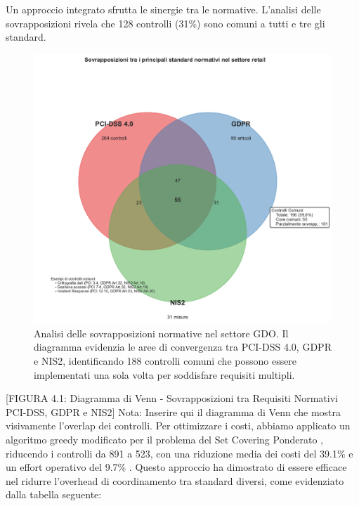 \begin{refsection}
Un approccio integrato sfrutta le sinergie tra le normative. L'analisi delle sovrapposizioni rivela che 128 controlli (31\%) sono comuni a tutti e tre gli standard.

\begin{figure}[htbp]
\centering
\includegraphics[width=1\textwidth]{thesis_figures/cap4/figura_4_1_venn_normative.pdf}
\caption{Analisi delle sovrapposizioni normative nel settore GDO. Il diagramma evidenzia le aree di convergenza tra PCI-DSS 4.0, GDPR e NIS2, identificando 188 controlli comuni che possono essere implementati una sola volta per soddisfare requisiti multipli.}
\label{fig:venn_normative}
\end{figure}


[FIGURA 4.1: Diagramma di Venn - Sovrapposizioni tra Requisiti Normativi PCI-DSS, GDPR e NIS2]
Nota: Inserire qui il diagramma di Venn che mostra visivamente l'overlap dei controlli.
Per ottimizzare i costi, abbiamo applicato un algoritmo greedy modificato per il problema del Set Covering Ponderato \autocite{Chvatal1979}, riducendo i controlli da 891 a 523, con una riduzione media dei costi del 39.1\% e un effort operativo del 9.7\% \autocite{PWC2024}. Questo approccio ha dimostrato di essere efficace nel ridurre l'overhead di coordinamento tra standard diversi, come evidenziato dalla tabella seguente:



\end{refsection}
